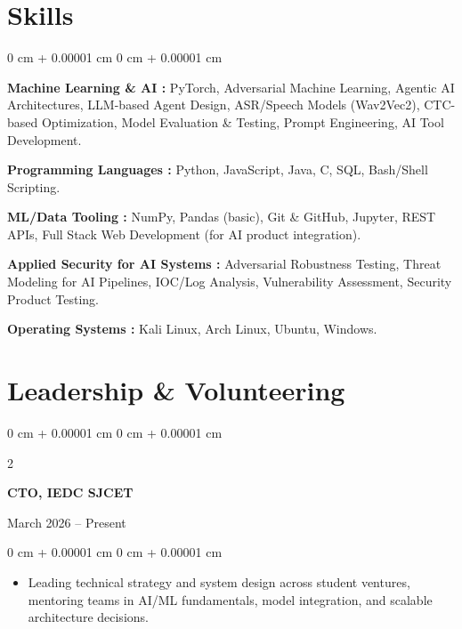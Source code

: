 \documentclass[10pt, a4paper]{article}
\newenvironment{highlights}{
    \begin{itemize}[
        topsep=0.10 cm,
        parsep=0.10 cm,
        partopsep=0pt,
        itemsep=0pt,
        leftmargin=0 cm + 10pt
    ]
}{
    \end{itemize}
} %
\newenvironment{onecolentry}{
    \begin{adjustwidth}{
        0 cm + 0.00001 cm
    }{
        0 cm + 0.00001 cm
    }
}{
    \end{adjustwidth}
} %
\newenvironment{twocolentry}[2][]{
    \onecolentry
    \def\secondColumn{#2}
    \setcolumnwidth{\fill, 4.5 cm}
    \begin{paracol}{2}
}{
    \switchcolumn \raggedleft \secondColumn
    \end{paracol}
    \endonecolentry
} %
\begin{document}
   \section{Skills}

    \begin{onecolentry}

        \textbf{Machine Learning \& AI :} PyTorch, Adversarial Machine Learning, Agentic AI Architectures, LLM-based Agent Design, ASR/Speech Models (Wav2Vec2), CTC-based Optimization, Model Evaluation \& Testing, Prompt Engineering, AI Tool Development.

        \vspace{0.1 cm}

        \textbf{Programming Languages :} Python, JavaScript, Java, C, SQL, Bash/Shell Scripting.

        \vspace{0.1 cm}

        \textbf{ML/Data Tooling :} NumPy, Pandas (basic), Git \& GitHub, Jupyter, REST APIs, Full Stack Web Development (for AI product integration).

        \vspace{0.1 cm}

        \textbf{Applied Security for AI Systems :} Adversarial Robustness Testing, Threat Modeling for AI Pipelines, IOC/Log Analysis, Vulnerability Assessment, Security Product Testing.

        \vspace{0.1 cm}

        \textbf{Operating Systems :} Kali Linux, Arch Linux, Ubuntu, Windows.

    \end{onecolentry}

    \section{Leadership \& Volunteering}

    \vspace{0.2 cm}

        \begin{twocolentry}{
            March 2026 – Present
        }
            \textbf{CTO, IEDC SJCET}
        \end{twocolentry}
        
        \vspace{0.10 cm}
        \begin{onecolentry}
            \begin{highlights}
                \item Leading technical strategy and system design across student ventures, mentoring teams in AI/ML fundamentals, model integration, and scalable architecture decisions.
            \end{highlights}
        \end{onecolentry}
        
\end{document}
